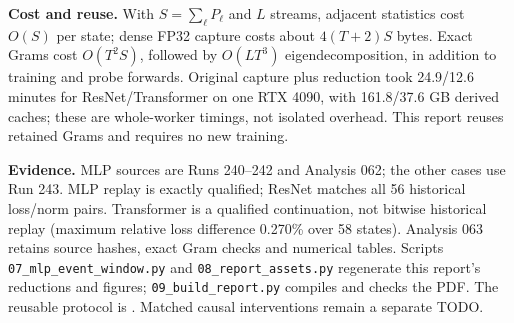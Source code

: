 \documentclass[11pt,a4paper]{article}
\begin{document}
\textbf{Cost and reuse.} With $S=\sum_\ell P_\ell$ and $L$ streams, adjacent
statistics cost $O(S)$ per state; dense FP32 capture costs about $4(T+2)S$ bytes.
Exact Grams cost $O(T^2S)$, followed by $O(LT^3)$ eigendecomposition, in addition
to training and probe forwards. Original capture plus reduction took 24.9/12.6
minutes for ResNet/Transformer on one RTX 4090, with 161.8/37.6 GB derived caches;
these are whole-worker timings, not isolated overhead. This report reuses
retained Grams and requires no new training.

\textbf{Evidence.} MLP sources are Runs 240--242 and Analysis 062;
the other cases use Run 243. MLP replay is exactly qualified;
ResNet matches all 56 historical loss/norm pairs. Transformer is a qualified
continuation, not bitwise historical replay (maximum relative loss difference
0.270\% over 58 states). Analysis 063 retains source hashes, exact Gram checks
and numerical tables. Scripts \texttt{07\_mlp\_event\_window.py} and
\texttt{08\_report\_assets.py} regenerate this report's reductions and figures;
\texttt{09\_build\_report.py} compiles and checks the PDF.
The reusable protocol is .
Matched causal interventions remain a separate TODO.
\end{document}
